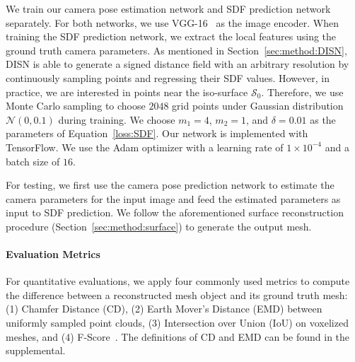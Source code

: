 We train our camera pose estimation network and SDF prediction network separately. For both networks, we use VGG-16~\cite{simonyan2014very} as the image encoder. When training the SDF prediction network, we extract the local features using the ground truth camera parameters. As mentioned in Section~\ref{sec:method:DISN}, DISN is able to generate a signed distance field with an arbitrary resolution by continuously sampling points and regressing their SDF values. However, in practice, we are interested in points near the iso-surface $\mathcal{S}_0$. Therefore, we use Monte Carlo sampling to choose $2048$ grid points under Gaussian distribution $\mathcal{N}(0, 0.1)$ during training. We choose $m_1 = 4$, $m_2 = 1$, and $\delta = 0.01$ as the parameters of Equation~\ref{loss:SDF}. Our network is implemented with TensorFlow. We use the Adam optimizer with a learning rate of $1\times10^{-4}$ and a batch size of $16$.  

For testing, we first use the camera pose prediction network to estimate the camera parameters for the input image and feed the estimated parameters as input to SDF prediction. We follow the aforementioned surface reconstruction procedure (Section~\ref{sec:method:surface}) to generate the output mesh. 

\paragraph{Evaluation Metrics}
For quantitative evaluations, we apply four commonly used metrics to compute the difference between a reconstructed mesh object and its ground truth mesh: (1) Chamfer Distance (CD), (2) Earth Mover’s Distance (EMD) between uniformly sampled point clouds, (3) Intersection over Union (IoU) on voxelized meshes, and (4) F-Score~\cite{tatarchenko2019single}. The definitions of CD and EMD can be found in the supplemental. 


